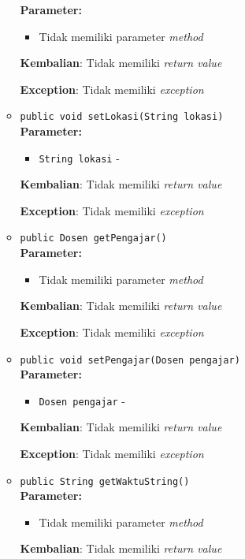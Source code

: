 \documentclass{article}
\begin{document}
\begin{enumerate}
\begin{itemize}
\textbf{Parameter:}\begin{itemize}
\item Tidak memiliki parameter \textit{method}
\end{itemize}
\textbf{Kembalian}: Tidak memiliki \textit{return value}

\textbf{Exception}: Tidak memiliki \textit{exception}

\item \texttt{public void setLokasi(String lokasi)}\\ 


\textbf{Parameter:}\begin{itemize}
\item \texttt{String lokasi} - 
\end{itemize}
\textbf{Kembalian}: Tidak memiliki \textit{return value}

\textbf{Exception}: Tidak memiliki \textit{exception}

\item \texttt{public Dosen getPengajar()}\\ 


\textbf{Parameter:}\begin{itemize}
\item Tidak memiliki parameter \textit{method}
\end{itemize}
\textbf{Kembalian}: Tidak memiliki \textit{return value}

\textbf{Exception}: Tidak memiliki \textit{exception}

\item \texttt{public void setPengajar(Dosen pengajar)}\\ 


\textbf{Parameter:}\begin{itemize}
\item \texttt{Dosen pengajar} - 
\end{itemize}
\textbf{Kembalian}: Tidak memiliki \textit{return value}

\textbf{Exception}: Tidak memiliki \textit{exception}

\item \texttt{public String getWaktuString()}\\ 


\textbf{Parameter:}\begin{itemize}
\item Tidak memiliki parameter \textit{method}
\end{itemize}
\textbf{Kembalian}: Tidak memiliki \textit{return value}


\end{itemize}
\end{enumerate}
\end{document}
